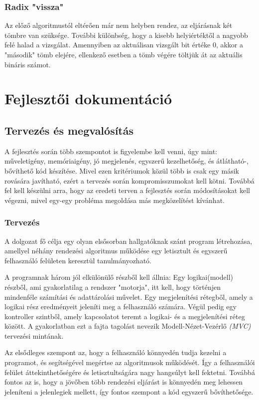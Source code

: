 \documentclass{elteikthesis}
\begin{document}
\subsection{Radix "vissza"}
Az előző algoritmustól eltérően már nem helyben rendez, az eljárásnak két tömbre van szüksége. További különbség, hogy a kisebb helyiértéktől a nagyobb felé halad a vizsgálat. Amennyiben az aktuálisan vizsgált bit értéke 0, akkor a "második" tömb elejére, ellenkező esetben a tömb végére töltjük át az aktuális bináris számot.

\chapter{Fejlesztői dokumentáció}

\section{Tervezés és megvalósítás}
A fejlesztés során több szempontot is figyelembe kell venni, úgy mint: műveletigény, memóriaigény, jó megjelenés, egyszerű kezelhetőség, és átlátható-, bővíthető kód készítése. Mivel ezen kritériumok közül több is csak egy másik rovására javítható, ezért a tervezés során kompromisszumokat kell kötni. Továbbá fel kell készülni arra, hogy az eredeti terven a fejlesztés során módosításokat kell végezni, mivel egy-egy probléma megoldása más megközelítést kívánhat.

\subsection{Tervezés}
A dolgozat fő célja egy olyan elsősorban hallgatóknak szánt program létrehozása, amellyel néhány rendezési algoritmus működése egy letisztult és egyszerű felhasználó felületen keresztül tanulmányozható.\par
A programnak három jól elkülönülő részből kell állnia:
Egy logikai(modell) részből, ami gyakorlatilag a rendszer "motorja", itt kell, hogy történjen mindenféle számítási és adattárolási művelet. Egy megjelenítési rétegből, amely a logikai rész eredményeit jeleníti meg a felhasználó számára. Végül pedig egy kontroller szintből, amely kapcsolatot teremt a logikai- és a megjelenítési réteg között. A gyakorlatban ezt a fajta tagolást nevezik Modell-Nézet-Vezérlő \emph{(MVC)} tervezési mintának.\par
Az elsődleges szempont az, hogy a felhasználó könnyedén tudja kezelni a programot, és segítségével megértse az algoritmusok működését. Így a felhasználói felület áttekinthetőségére és letisztultságára nagy hangsúlyt kell fektetni. Továbbá fontos az is, hogy a jövőben több rendezési eljárást is könnyedén meg lehessen jeleníteni a jelenlegiek mellett, így fontos szempont a kód egyszerű bővíthetősége.
\end{document}
